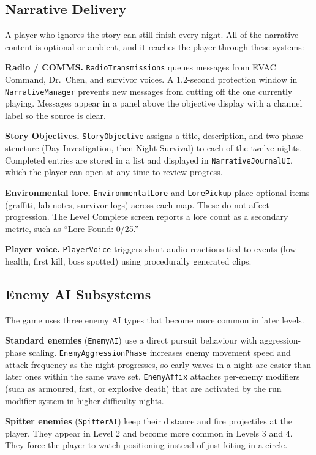 \documentclass[11pt,a4paper]{article}
\begin{document}
\subsection{Narrative Delivery}

A player who ignores the story can still finish every night. All of the narrative content is optional or ambient, and it reaches the player through these systems:

\textbf{Radio / COMMS.} \texttt{RadioTransmissions} queues messages from EVAC Command, Dr.~Chen, and survivor voices. A 1.2-second protection window in \texttt{NarrativeManager} prevents new messages from cutting off the one currently playing. Messages appear in a panel above the objective display with a channel label so the source is clear.

\textbf{Story Objectives.} \texttt{StoryObjective} assigns a title, description, and two-phase structure (Day Investigation, then Night Survival) to each of the twelve nights. Completed entries are stored in a list and displayed in \texttt{NarrativeJournalUI}, which the player can open at any time to review progress.

\textbf{Environmental lore.} \texttt{EnvironmentalLore} and \texttt{LorePickup} place optional items (graffiti, lab notes, survivor logs) across each map. These do not affect progression. The Level Complete screen reports a lore count as a secondary metric, such as ``Lore Found: 0/25.''

\textbf{Player voice.} \texttt{PlayerVoice} triggers short audio reactions tied to events (low health, first kill, boss spotted) using procedurally generated clips.

\subsection{Enemy AI Subsystems}

The game uses three enemy AI types that become more common in later levels.

\textbf{Standard enemies} (\texttt{EnemyAI}) use a direct pursuit behaviour with aggression-phase scaling. \texttt{EnemyAggressionPhase} increases enemy movement speed and attack frequency as the night progresses, so early waves in a night are easier than later ones within the same wave set. \texttt{EnemyAffix} attaches per-enemy modifiers (such as armoured, fast, or explosive death) that are activated by the run modifier system in higher-difficulty nights.

\textbf{Spitter enemies} (\texttt{SpitterAI}) keep their distance and fire projectiles at the player. They appear in Level 2 and become more common in Levels 3 and 4. They force the player to watch positioning instead of just kiting in a circle.
\end{document}
